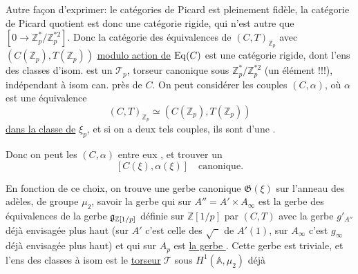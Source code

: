 Autre façon d'exprimer: le   catégories de Picard 
est pleinement fidèle, la catégorie de Picard quotient est donc une catégorie rigide, qui n'est autre que
$[0\longrightarrow\mathbb Z_p^*/\mathbb Z_p^{*2}]$.
Donc la catégorie des équivalences de $(C,T)_{\mathbb Z_p}$ avec $(C(\mathbb Z_p),T(\mathbb Z_p))$
\uline{modulo action de} $\mathrm{Eq}(C)$ est une catégorie rigide,
 dont l'ens des classes d'isom. est un $\mathcal T_p$, torseur canonique sous $\mathbb Z_p^*/\mathbb Z_p^{*2}$ (un élément !!!), indépendant à isom can. près de $C$.
On peut considérer les couples $(C,\alpha)$, où $\alpha$ est une équivalence
\[
(C,T)_{\mathbb Z_p}\simeq(C(\mathbb Z_p),T(\mathbb Z_p))
\]
\uline{dans la classe de} $\xi_p$, et
si on a deux tels couples, ils sont \uline{} d'une .


Donc on peut   les $(C,\alpha)$  entre eux , et trouver un
\[
[C(\xi),\alpha(\xi)]\quad\text{canonique}.
\]


En fonction de ce choix, on trouve une gerbe canonique $\mathfrak G(\xi)$ sur l'anneau des adèles, de groupe $\mu_2$, savoir la gerbe qui sur $A''=A'\times A_\infty$ est la gerbe des équivalences de la gerbe $\mathfrak g_{\mathbb Z[1/p]}$  définie sur $\mathbb Z[1/p]$ par $(C,T)$  avec la gerbe $g'_{A''}$ déjà envisagée plus haut (sur $A'$ c'est celle des $\sqrt{\phantom{a}}$ de $A'(1)$, sur $A_\infty$ c'est $g_\infty$ déjà envisagée plus haut) et qui sur $A_p$ est \uline{la gerbe }.
Cette gerbe est triviale, et l'ens des classes  à isom  est le \uline{torseur} $\mathcal T$ sous $H^1(\mathbb A,\mu_2)$ déjà 

